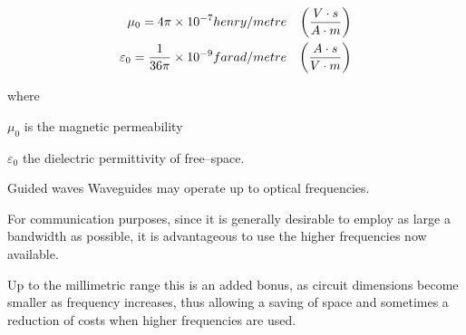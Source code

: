 \documentclass[10pt]{beamer}
\begin{document}
\begin{frame}[fragile]{}
%
\begin{eqnarray}
{\mu}_{0} = 4 \pi \times 10^{-7} henry/metre & 
 & \left( {V \cdot s \over A \cdot m} \right) \nonumber \\
%
 \varepsilon_{0} = {1 \over 36 \pi} \times 10^{-9} farad/metre
& & \left( {A \cdot s \over V \cdot m} \right) 
\label{permittivity}
\end{eqnarray}

%
%
where  

$\mu_{0}$ is the magnetic permeability 

$\varepsilon_{0}$ the  dielectric permittivity of 
free--space. 
\end{frame}
\begin{frame}[fragile]{Guided waves}
%
Waveguides may operate up to optical
frequencies. 

For communication  purposes, since
it   is   generally desirable to employ  as \alert{large a
bandwidth}  as possible, it is
advantageous  to use  the higher frequencies
now available. 

Up to the millimetric range this is an added 
bonus, as \alert{circuit  dimensions   become   smaller   as frequency
increases}, thus allowing  a  saving of  space
and sometimes a reduction of  costs when higher
frequencies are used.

\end{frame}
\end{document}
